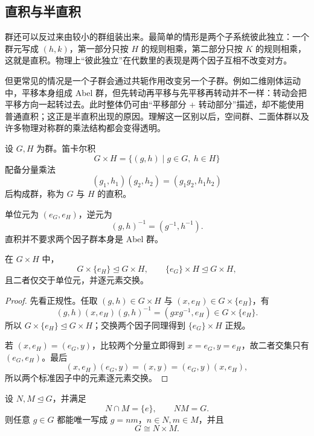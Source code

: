 \subsection{直积与半直积}
\label{sec:products}

群还可以反过来由较小的群组装出来。最简单的情形是两个子系统彼此独立：一个群元写成 $(h,k)$，第一部分只按 $H$ 的规则相乘，第二部分只按 $K$ 的规则相乘，这就是直积。物理上“彼此独立”在代数里的表现是两个因子互相不改变对方。

但更常见的情况是一个子群会通过共轭作用改变另一个子群。例如二维刚体运动中，平移本身组成 Abel 群，但先转动再平移与先平移再转动并不一样：转动会把平移方向一起转过去。此时整体仍可由“平移部分 + 转动部分”描述，却不能使用普通直积；这正是半直积出现的原因。理解这一区别以后，空间群、二面体群以及许多物理对称群的乘法结构都会变得透明。

\begin{definition}[群的直积]
设 $G,H$ 为群。笛卡尔积
\[
G\times H=\{(g,h)\mid g\in G,\ h\in H\}
\]
配备分量乘法
\[
(g_1,h_1)(g_2,h_2)
=(g_1g_2,h_1h_2)
\label{eq:direct-product}
\]
后构成群，称为 $G$ 与 $H$ 的直积。
\label{def:direct-product}
\end{definition}

单位元为 $(e_G,e_H)$，逆元为
\[
(g,h)^{-1}=(g^{-1},h^{-1}).
\]
直积并不要求两个因子群本身是 Abel 群。

\begin{proposition}[直积中的标准正规子群]
在 $G\times H$ 中，
\[
G\times\{e_H\}\mathrel{\trianglelefteq} G\times H,
\qquad
\{e_G\}\times H\mathrel{\trianglelefteq} G\times H,
\]
且二者仅交于单位元，并逐元素交换。
\label{prop:direct-product-factors}

\end{proposition}

\begin{proof}
先看正规性。任取 $(g,h)\in G\times H$ 与 $(x,e_H)\in G\times\{e_H\}$，有
\[
(g,h)(x,e_H)(g,h)^{-1}
=(gxg^{-1},e_H)\in G\times\{e_H\}.
\]
所以 $G\times\{e_H\}\mathrel{\trianglelefteq} G\times H$；交换两个因子同理得到 $\{e_G\}\times H$ 正规。

若 $(x,e_H)=(e_G,y)$，比较两个分量立即得到 $x=e_G,y=e_H$，故二者交集只有 $(e_G,e_H)$。最后
\[
(x,e_H)(e_G,y)=(x,y)=(e_G,y)(x,e_H),
\]
所以两个标准因子中的元素逐元素交换。
\end{proof}

\begin{theorem}[内直积判据]
设 $N,M\mathrel{\trianglelefteq} G$，并满足
\[
N\cap M=\{e\},
\qquad
NM=G.
\]
则任意 $g\in G$ 都能唯一写成 $g=nm$，$n\in N,m\in M$，并且
\[
G\cong N\times M.
\label{eq:internal-direct-product}
\]
\label{thm:internal-direct-product}

\end{theorem}

